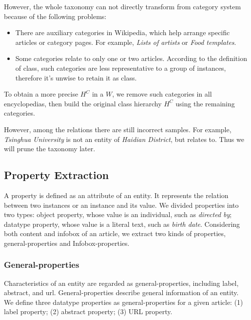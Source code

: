 \documentclass[runningheads,a4paper]{llncs}
\begin{document}
However, the whole taxonomy can not directly transform from category system because of the following problems:
\begin{itemize}
    \item There are auxiliary categories in Wikipedia, which help arrange specific articles or category pages. For example, \emph{Lists of artists} or \emph{Food templates}.
    \item Some categories relate to only one or two articles. According to the definition of class, such categories are less representative to a group of instances, therefore it's unwise to retain it as class.
\end{itemize}

To obtain a more precise $H^C$ in a $W$, we remove such categories in all encyclopedias, then build the original class hierarchy $H^C$ using the remaining categories.

However, among the relations there are still incorrect samples. For example, \emph{Tsinghua University} is not an entity of \emph{Haidian District}, but relates to. Thus we will prune the taxonomy later.

\subsection{Property Extraction}
\label{sec:pe}
A property is defined as an attribute of an entity. It represents the relation between two instances or an instance and its value. We divided properties into two types: object property, whose value is an individual, such as \emph{directed by}; datatype property, whose value is a literal text, such as \emph{birth date}. Considering both content and infobox of an article, we extract two kinds of properties, general-properties and Infobox-properties.

\subsubsection{General-properties}
Characteristics of an entity are regarded as general-properties, including label, abstract, and url. General-properties describe general information of an entity. We define three datatype properties as general-properties for a given article: (1) label property; (2) abstract property; (3) URL property.
\end{document}
